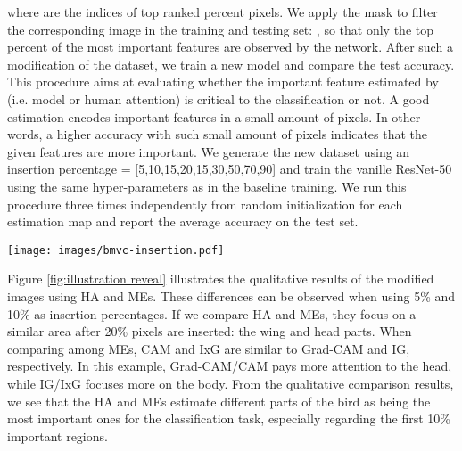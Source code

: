 \documentclass{bmvc2k}
\begin{document}
where  are the indices of top ranked  percent pixels.
We apply the mask  to filter the corresponding image  in the training and testing set: , so that only the top  percent of the most important features are observed by the network. After such a modification of the dataset, we train a new model and compare the test accuracy. This procedure aims at evaluating whether the important feature estimated by  (i.e. model or human attention) is critical to the classification or not. A good estimation  encodes important features in a small amount of pixels. In other words, a higher accuracy with such small amount of pixels indicates that the given features are more important. We generate the new dataset using an insertion percentage  = [5,10,15,20,15,30,50,70,90] and train the vanille ResNet-50 \cite{he2016deep} using the same hyper-parameters as in the baseline training. We run this procedure three times independently from random initialization for each estimation map and report the average accuracy on the test set. 

\begin{figure*}[t]
\centering
         \begin{center}
            \texttt{[image: images/bmvc-insertion.pdf]}
         \end{center}
   \caption{Modified images in the Keep and Retrain procedure. The pixels are inserted according to the importance in the estimation maps. \textbf{Top to bottom}: importance estimation maps (saliency maps), modified images using top 5\%, 10\% and 20\% important pixels in saliency maps. \textbf{Left to right}: HA, ME-Gradient-based CAM (Grad-CAM)~\cite{20_grad_cam}, Class Activations Maps (CAM)~\cite{19_cam}, InputXGradient (IxG)~\cite{shrikumar2016not} and Integrated Gradients (IG)~\cite{IG}.}
   \vspace{-0.5cm}
\label{fig:illustration reveal}
\end{figure*}

Figure \ref{fig:illustration reveal} illustrates the qualitative results of the modified images using HA and MEs. These differences can be observed when using 5\% and 10\% as insertion percentages. If we compare HA and MEs, they focus on a similar area after 20\% pixels are inserted: the wing and head parts. When comparing among MEs, CAM and IxG are similar to Grad-CAM and IG, respectively. In this example, Grad-CAM/CAM pays more attention to the head, while IG/IxG focuses more on the body. From the qualitative comparison results, we see that the HA and MEs estimate different parts of the bird as being the most important ones for the classification task, especially regarding the first 10\% important regions. 
\end{document}
